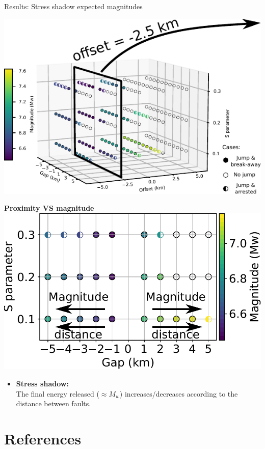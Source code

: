 \documentclass{beamer}
\newcommand\dirbiblio{../../biblio/}
\begin{document}
\begin{frame}
\end{frame}


\begin{frame}
 {Results: Stress shadow  expected magnitudes}
 
 \begin{minipage}{0.45\linewidth}
  \includegraphics[width=1\linewidth]{images/tests_shmax340_1plane2}
 \end{minipage} \pause
 \begin{minipage}{0.5\linewidth}
  \vskip -0.1cm
  \begin{center}
  \textbf{Proximity VS magnitude}
  \vskip 0.2cm
  \includegraphics[width=0.9\linewidth]{images/tests_stress} \pause   
  \end{center}
  \vskip -0.3cm
  \begin{itemize}
   \item[\ding{43}] {\scriptsize \textbf{Stress shadow:} \\
                    The final energy released ($\approx M_w$) increases/decreases according to the distance between faults.}
  \end{itemize}
 \end{minipage}
  
\end{frame}



\section*{References}
\begin{frame}

    {\tiny  }							    

\end{frame}
\end{document}
